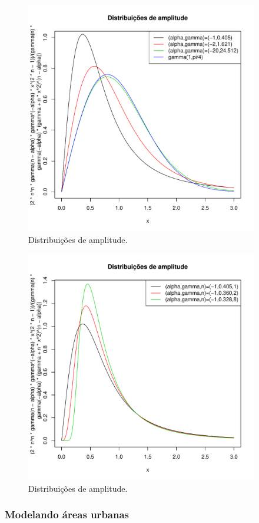 \documentclass[10pt,a4paper]{article}
\begin{document}
\begin{figure}[!htb]
\centering
\includegraphics[width=4.0in]{fig_eq_ga_fig1_frery_muller_1997.pdf}
	\caption{Distribuições de amplitude.}
\label{sec64fig1}
\end{figure}

\begin{figure}[!htb]
\centering
\includegraphics[width=4.0in]{fig_eq_ga_fig2_frery_muller_1997.pdf}
	\caption{Distribuições de amplitude.}
\label{sec64fig2}
\end{figure}

\subsubsection{Modelando áreas urbanas}
\end{document}
